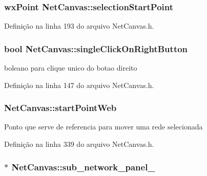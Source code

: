 \subsubsection[{selection\+Start\+Point}]{\setlength{\rightskip}{0pt plus 5cm}wx\+Point Net\+Canvas\+::selection\+Start\+Point}\label{class_net_canvas_a062ebd205f99b70c27286ee583cc6bda}


Definição na linha 193 do arquivo Net\+Canvas.\+h.

\subsubsection[{single\+Click\+On\+Right\+Button}]{\setlength{\rightskip}{0pt plus 5cm}bool Net\+Canvas\+::single\+Click\+On\+Right\+Button}\label{class_net_canvas_ae836673ae1437e30e1ca9caa3c134c0d}
boleano para clique unico do botao direito 

Definição na linha 147 do arquivo Net\+Canvas.\+h.

\subsubsection[{start\+Point\+Web}]{ Net\+Canvas\+::start\+Point\+Web\hspace{0.3cm}{\ttfamily [protected]}}\label{class_net_canvas_a4a3ca13cdc12ae5b51e5d72cc8e785ae}
Ponto que serve de referencia para mover uma rede selecionada 

Definição na linha 339 do arquivo Net\+Canvas.\+h.

\subsubsection[{sub\+\_\+network\+\_\+panel\+\_\+}]{$\ast$ Net\+Canvas\+::sub\+\_\+network\+\_\+panel\+\_\+}\label{class_net_canvas_a5b43a58995179ee0ef68aa69e4b129f8}


